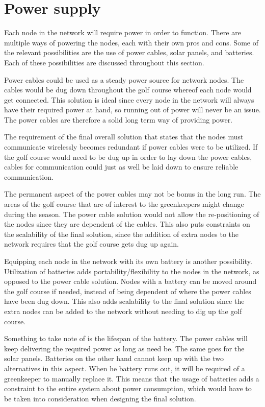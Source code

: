 \section{Power supply}

Each node in the network will require power in order to function. There are multiple ways of powering the nodes, each with their own pros and cons. Some of the relevant possibilities are the use of power cables, solar panels, and batteries. Each of these possibilities are discussed throughout this section.


Power cables could be used as a steady power source for network nodes. The cables would be dug down throughout the golf course whereof each node would get connected. This solution is ideal since every node in the network will always have their required power at hand, so running out of power will never be an issue. The power cables are therefore a solid long term way of providing power.

The requirement of the final overall solution that states that the nodes must communicate wirelessly becomes redundant if power cables were to be utilized. If the golf course would need to be dug up in order to lay down the power cables, cables for communication could just as well be laid down to ensure reliable communication.

The permanent aspect of the power cables may not be bonus in the long run. The areas of the golf course that are of interest to the greenkeepers might change during the season. The power cable solution would not allow the re-positioning of the nodes since they are dependent of the cables. This also puts constraints on the scalability of the final solution, since the addition of extra nodes to the network requires that the golf course gets dug up again.

Equipping each node in the network with its own battery is another possibility. Utilization of batteries adds portability/flexibility to the nodes in the network, as opposed to the power cable solution. Nodes with a battery can be moved around the golf course if needed, instead of being dependent of where the power cables have been dug down. This also adds scalability to the final solution since the extra nodes can be added to the network without needing to dig up the golf course.

Something to take note of is the lifespan of the battery. The power cables will keep delivering the required power as long as need be. The same goes for the solar panels. Batteries on the other hand cannot keep up with the two alternatives in this aspect. When he battery runs out, it will be required of a greenkeeper to manually replace it. This means that the usage of batteries adds a constraint to the entire system about power consumption, which would have to be taken into consideration when designing the final solution.

